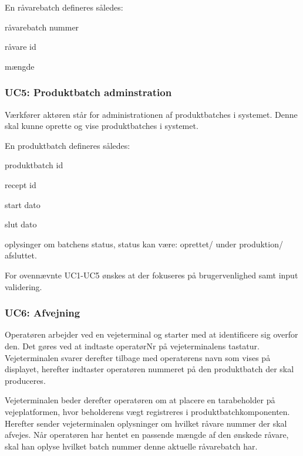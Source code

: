 \documentclass[a4paper]{article}
\newenvironment{my_itemize}
{\begin{itemize}
  \setlength{\itemsep}{1pt}
  \setlength{\parskip}{0pt}
  \setlength{\parsep}{0pt}}
{\end{itemize}}
\begin{document}
En råvarebatch defineres således:

\begin{my_itemize}
  \item råvarebatch nummer
  \item råvare id
  \item mængde
\end{my_itemize}


\subsubsection*{UC5: Produktbatch adminstration} %

Værkfører aktøren står for administrationen af produktbatches i systemet. Denne skal kunne oprette og vise produktbatches i systemet.

En produktbatch defineres således:

\begin{my_itemize}
  \item produktbatch id
  \item recept id
  \item start dato
  \item slut dato
  \item oplysinger om batchens status, status kan være: oprettet/ under produktion/ afsluttet.
\end{my_itemize}

For ovennævnte UC1-UC5 ønskes at der fokuseres på brugervenlighed samt input validering.


\subsubsection*{UC6: Afvejning} %

Operatøren arbejder ved en vejeterminal og starter med at identificere sig overfor den. Det gøres ved at indtaste operatørNr på vejeterminalens tastatur. Vejeterminalen svarer derefter tilbage med operatørens navn som vises på displayet, herefter indtaster operatøren nummeret på den produktbatch der skal produceres.

Vejeterminalen beder derefter operatøren om at placere en tarabeholder på vejeplatformen, hvor beholderens vægt registreres i produktbatchkomponenten. Herefter sender vejeterminalen oplysninger om hvilket råvare nummer der skal afvejes. Når operatøren har hentet en passende mængde af den ønskede råvare, skal han oplyse hvilket batch nummer denne aktuelle råvarebatch har.
\end{document}
